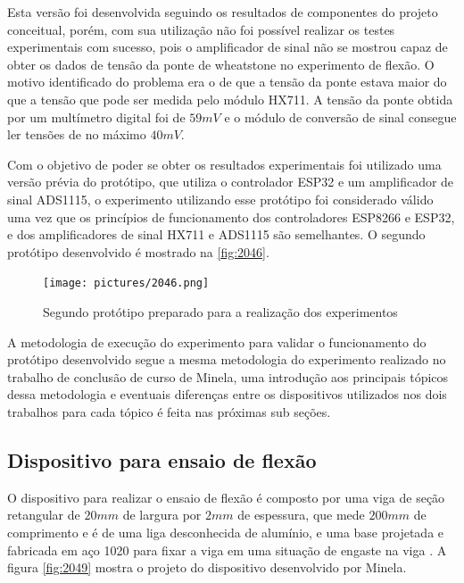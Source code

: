 Esta versão foi desenvolvida seguindo os resultados de componentes do projeto conceitual, porém, com sua utilização não foi possível realizar os testes experimentais com sucesso,
pois o amplificador de sinal não se mostrou capaz de obter os dados de tensão da ponte de wheatstone no experimento de flexão.
O motivo identificado do problema era o de que a tensão da ponte estava maior do que a tensão que pode ser medida pelo módulo HX711.
A tensão da ponte obtida por um multímetro digital foi de $ 59mV $ e o módulo de conversão de sinal consegue ler tensões de no máximo $ 40mV $.

Com o objetivo de poder se obter os resultados experimentais foi utilizado uma versão prévia do protótipo, que utiliza o controlador ESP32 e um amplificador
de sinal ADS1115, o experimento utilizando esse protótipo foi considerado válido uma vez que os princípios de funcionamento dos controladores ESP8266 e ESP32,
e dos amplificadores de sinal HX711 e ADS1115 são semelhantes.
O segundo protótipo desenvolvido é mostrado na \autoref{fig:2046}.

\begin{figure}[H]
	\caption{\label{fig:2046} Segundo protótipo preparado para a realização dos experimentos}
		\begin{center}
			\texttt{[image: pictures/2046.png]}
		\end{center}
\end{figure}

A metodologia de execução do experimento para validar o funcionamento do protótipo desenvolvido segue a mesma metodologia do experimento realizado no trabalho de conclusão
de curso de Minela, uma introdução aos principais tópicos dessa metodologia e eventuais diferenças entre os dispositivos utilizados nos dois trabalhos para cada tópico é feita
nas próximas sub seções.

\subsection{Dispositivo para ensaio de flexão}

O dispositivo para realizar o ensaio de flexão é composto por uma viga de seção retangular de $20mm$ de largura por $2mm$ de espessura, que mede $200mm$
de comprimento e é de uma liga desconhecida de alumínio, e uma base projetada e fabricada em aço 1020 para fixar a viga em uma situação de engaste na viga \autocite{Minela2017}.
A figura \autoref{fig:2049} mostra o projeto do dispositivo desenvolvido por Minela.


